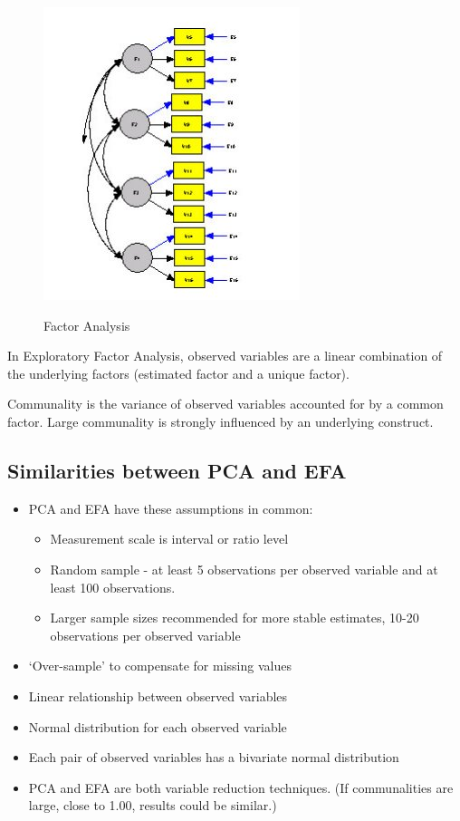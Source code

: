 \documentclass[a4paper,12pt]{article}
\begin{document}
\begin{figure}[h!]
\begin{center}
  \includegraphics[scale=0.6]{4AFactor.jpg}\\
  \caption{Factor Analysis}
\end{center}
\end{figure}

In Exploratory Factor Analysis, observed variables are a linear combination of the underlying factors (estimated factor and a unique factor).

Communality is the variance of observed variables accounted for by a common factor. Large communality is strongly
influenced by an underlying construct.

\subsection{Similarities between PCA and EFA}
\begin{itemize}
\item PCA and EFA have these assumptions in common:
\begin{itemize}
\item Measurement scale is interval or ratio level
\item Random sample - at least 5 observations per observed variable and at least 100 observations.
\item Larger sample sizes recommended for more stable estimates, 10-20 observations per observed variable
\end{itemize}
\item `Over-sample' to compensate for missing values
\item Linear relationship between observed variables
\item Normal distribution for each observed variable
\item Each pair of observed variables has a bivariate normal distribution
\item PCA and EFA are both variable reduction techniques. (If communalities are large, close to 1.00, results could be similar.)
\end{itemize}
\end{document}
